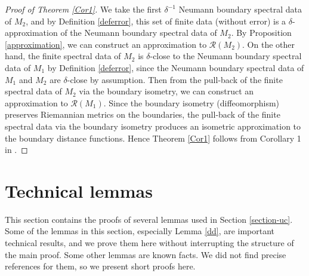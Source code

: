 \documentclass[11pt,letterpaper]{amsart}
\numberwithin{equation}{section}
\theoremstyle{definition}
\theoremstyle{plain}
\theoremstyle{definition}
\theoremstyle{plain}
\theoremstyle{definition}
\theoremstyle{plain}
\begin{document}
\begin{proof}[Proof of Theorem \ref{Cor1}]
We take the first $\delta^{-1}$ Neumann boundary spectral data of $M_2$, and by Definition \ref{deferror}, this set of finite data (without error) is a $\delta$-approximation of the Neumann boundary spectral data of $M_2$. By Proposition \ref{approximation}, we can construct an approximation to $\mathcal{R}(M_2)$. On the other hand, the finite spectral data of $M_2$ is $\delta$-close to the Neumann boundary spectral data of $M_1$ by Definition \ref{deferror}, since the Neumann boundary spectral data of $M_1$ and $M_2$ are $\delta$-close by assumption. Then from the pull-back of the finite spectral data of $M_2$ via the boundary isometry, we can construct an approximation to $\mathcal{R}(M_1)$. Since the boundary isometry (diffeomorphism) preserves Riemannian metrics on the boundaries, the pull-back of the finite spectral data via the boundary isometry produces an isometric approximation to the boundary distance functions. Hence Theorem \ref{Cor1} follows from Corollary 1 in \cite{KKL2}.
\end{proof}


\section{Technical lemmas}\label{auxiliary}

This section contains the proofs of several lemmas used in Section \ref{section-uc}. Some of the lemmas in this section, especially Lemma \ref{dd}, are important technical results, and we prove them here without interrupting the structure of the main proof. Some other lemmas are known facts. We did not find precise references for them, so we present short proofs here.
\end{document}
